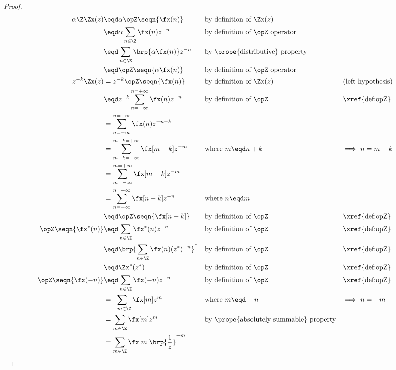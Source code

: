 \begin{proof}
\begin{align*}
  \alpha\Z\Zx(z)
    &\eqd \alpha \opZ \seqn{\fx(n)}                && \text{by definition of $\Zx(z)$}
  \\&\eqd \alpha \sum_{n\in\Z} \fx(n) z^{-n}       && \text{by definition of $\opZ$ operator}
  \\&\eqd \sum_{n\in\Z} \brp{\alpha\fx(n)} z^{-n}  && \text{by \prope{distributive} property}
  \\&\eqd \opZ\seqn{\alpha\fx(n)}                  && \text{by definition of $\opZ$ operator}
  \\
  z^{-k}\Zx(z) 
    &= z^{-k} \opZ\seqn{\fx(n)}
    && \text{by definition of $\Zx(z)$}
    && \text{(left hypothesis)}
  \\&\eqd z^{-k}\sum_{n=-\infty}^{n=+\infty} \fx(n) z^{-n}
    && \text{by definition of $\opZ$}
    && \text{\xref{def:opZ}}
  \\&=          \sum_{n=-\infty}^{n=+\infty} \fx(n) z^{-n-k}
  \\&=          \sum_{m-k=-\infty}^{m-k=+\infty} \fx[m-k] z^{-m}
    && \text{where $m\eqd n+k$}
    && \text{$\implies$ $n=m-k$}
  \\&=          \sum_{m=-\infty}^{m=+\infty} \fx[m-k] z^{-m}
  \\&=          \sum_{n=-\infty}^{n=+\infty} \fx[n-k] z^{-n}
    && \text{where $n\eqd m$}
  \\&\eqd \opZ\seqn{\fx[n-k]}
    && \text{by definition of $\opZ$}
    && \text{\xref{def:opZ}}
  \\
  \opZ\seqn{\fx^\ast(n)}  
    &\eqd \sum_{n\in\Z}\fx^\ast(n) z^{-n}
    && \text{by definition of $\opZ$}
    && \text{\xref{def:opZ}}
  \\&\eqd \brp{\sum_{n\in\Z}\fx(n) (z^\ast)^{-n}}^\ast
    && \text{by definition of $\opZ$}
    && \text{\xref{def:opZ}}
  \\&\eqd \Zx^\ast(z^\ast)
    && \text{by definition of $\opZ$}
    && \text{\xref{def:opZ}}
  \\
  \opZ\seqn{\fx(-n)}  
    &\eqd \sum_{n\in\Z}\fx(-n) z^{-n}
    && \text{by definition of $\opZ$}
    && \text{\xref{def:opZ}}
  \\&= \sum_{-m\in\Z}\fx[m] z^{m}
    && \text{where $m\eqd -n$}
    && \text{$\implies$ $n=-m$}
  \\&= \sum_{m\in\Z}\fx[m] z^{m}
    && \text{by \prope{absolutely summable} property}
  \\&= \sum_{m\in\Z}\fx[m] \brp{\frac{1}{z}}^{-m}

\end{align*}
\end{proof}
